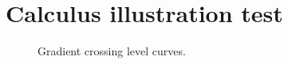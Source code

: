 \documentclass[11pt]{article}
\begin{document}
\section*{Calculus illustration test}
\begin{figure}[H]
\centering

\caption{Gradient crossing level curves.}
\end{figure}
\end{document}
